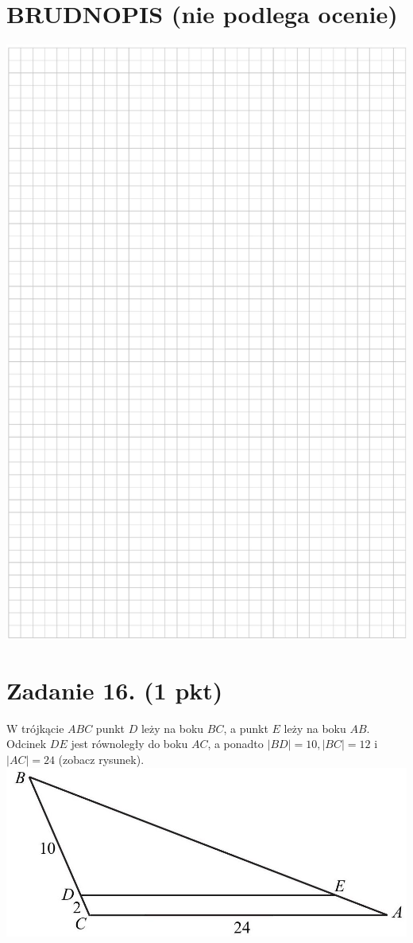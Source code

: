 \documentclass[10pt]{article}
\begin{document}
\section*{BRUDNOPIS (nie podlega ocenie)}
\begin{center}
\includegraphics[max width=\textwidth]{2024_11_21_ad8c43efe74fa059d24eg-09}
\end{center}

\section*{Zadanie 16. (1 pkt)}
W trójkącie \(A B C\) punkt \(D\) leży na boku \(B C\), a punkt \(E\) leży na boku \(A B\). Odcinek \(D E\) jest równoległy do boku \(A C\), a ponadto \(|B D|=10,|B C|=12\) i \(|A C|=24\) (zobacz rysunek).\\
\includegraphics[max width=\textwidth, center]{2024_11_21_ad8c43efe74fa059d24eg-10(1)}
\end{document}

